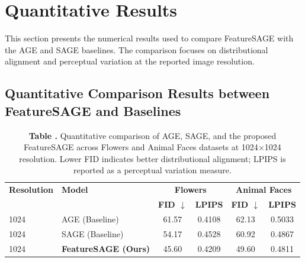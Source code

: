 \section{Quantitative Results}

This section presents the numerical results used to compare FeatureSAGE with the AGE and SAGE baselines. The comparison focuses on distributional alignment and perceptual variation at the reported image resolution.

\subsection{Quantitative Comparison Results between FeatureSAGE and Baselines}

\begin{table}[ht]
\centering
\caption[Quantitative comparison at 1024 resolution]{\textbf{Table \thetable.} Quantitative comparison of AGE, SAGE, and the proposed FeatureSAGE across Flowers and Animal Faces datasets at 1024$\times$1024 resolution. Lower FID indicates better distributional alignment; LPIPS is reported as a perceptual variation measure.}
\label{tab:quantitative_comparison_1024}
\setlength{\tabcolsep}{10pt}
\begin{tabular}{ l l cc cc }
\hline
\textbf{Resolution} & \textbf{Model}
& \multicolumn{2}{c}{\textbf{Flowers}}
& \multicolumn{2}{c}{\textbf{Animal Faces}} \\ 
&
& \textbf{FID $\downarrow$} & \textbf{LPIPS}
& \textbf{FID $\downarrow$} & \textbf{LPIPS} \\ \hline
1024 & AGE (Baseline) & 61.57 & 0.4108 & 62.13 & 0.5033 \\ 
1024 & SAGE (Baseline) & 54.17 & 0.4528 & 60.92 & 0.4867 \\ 
1024 & \textbf{FeatureSAGE (Ours)} & 45.60 & 0.4209 & 49.60 & 0.4811 \\ \hline
\end{tabular}
\end{table}
